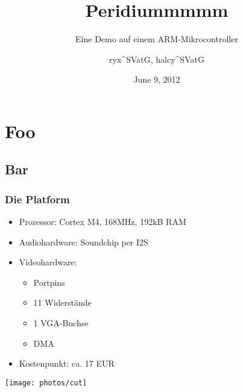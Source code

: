 \documentclass[t,14pt,aspectratio=169]{beamer}
\title{Peridiummmmm}
\subtitle{Eine Demo auf einem ARM-Mikrocontroller}
\author{ryx{\textasciicircum}SVatG, halcy{\textasciicircum}SVatG}
\begin{document}

\date{June 9, 2012}

\begin{frame} %
\titlepage
\end{frame}


\section{Foo}
\subsection{Bar}

\begin{frame} %
\frametitle{Die Platform}

\begin{minipage}{0.6\linewidth}
\begin{itemize}
\item Prozessor: Cortex M4, 168MHz, 192kB RAM
\item Audiohardware: Soundchip per I2S
\item Videohardware: 
\begin{itemize}
\item Portpins
\item 11 Widerstände
\item 1 VGA-Buchse
\item DMA
\end{itemize}
\item Kostenpunkt: ca. 17 EUR
\end{itemize}
\end{minipage}
\begin{minipage}{0.35\linewidth}
\texttt{[image: photos/cut]}
\end{minipage}
\end{frame}
\end{document}
